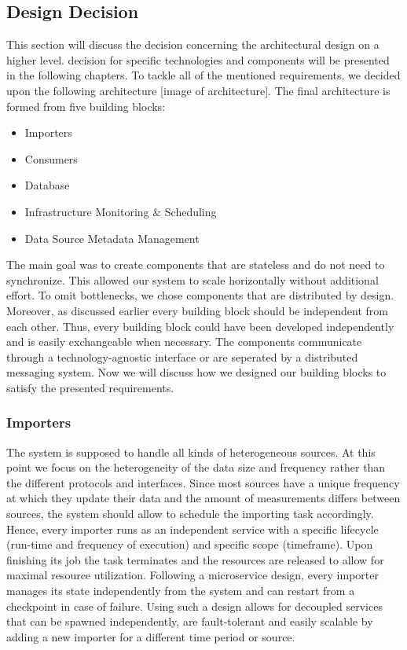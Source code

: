 \subsection{Design Decision}\label{design-decision}

This section will discuss the decision concerning the architectural
design on a higher level. decision for specific technologies and
components will be presented in the following chapters. To tackle all of
the mentioned requirements, we decided upon the following architecture
{[}image of architecture{]}. The final architecture is formed from five
building blocks:

\begin{itemize}
\tightlist
\item
  Importers
\item
  Consumers
\item
  Database
\item
  Infrastructure Monitoring \& Scheduling
\item
  Data Source Metadata Management
\end{itemize}

The main goal was to create components that are stateless and do not
need to synchronize. This allowed our system to scale horizontally
without additional effort. To omit bottlenecks, we chose components that
are distributed by design. Moreover, as discussed earlier every building
block should be independent from each other. Thus, every building block
could have been developed independently and is easily exchangeable when
necessary. The components communicate through a technology-agnostic
interface or are seperated by a distributed messaging system. Now we
will discuss how we designed our building blocks to satisfy the
presented requirements.

\subsubsection{Importers}\label{importers}

The system is supposed to handle all kinds of heterogeneous sources. At
this point we focus on the heterogeneity of the data size and frequency
rather than the different protocols and interfaces. Since most sources
have a unique frequency at which they update their data and the amount
of measurements differs between sources, the system should allow to
schedule the importing task accordingly. Hence, every importer runs as
an independent service with a specific lifecycle (run-time and frequency
of execution) and specific scope (timeframe). Upon finishing its job the
task terminates and the resources are released to allow for maximal
resource utilization. Following a microservice design, every importer
manages its state independently from the system and can restart from a
checkpoint in case of failure. Using such a design allows for decoupled
services that can be spawned independently, are fault-tolerant and
easily scalable by adding a new importer for a different time period or
source.

